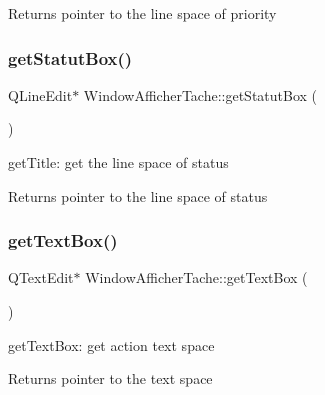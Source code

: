 \begin{DoxyReturn}{Returns}
pointer to the line space of priority 
\end{DoxyReturn}
\mbox{\label{class_window_afficher_tache_ae47fad44c28bba49406b648cb452038d}} 
\subsubsection{\texorpdfstring{get\+Statut\+Box()}{getStatutBox()}}
{\footnotesize\ttfamily Q\+Line\+Edit$\ast$ Window\+Afficher\+Tache\+::get\+Statut\+Box (\begin{DoxyParamCaption}{ }\end{DoxyParamCaption})\hspace{0.3cm}{\ttfamily [inline]}}



get\+Title\+: get the line space of status 

\begin{DoxyReturn}{Returns}
pointer to the line space of status 
\end{DoxyReturn}
\mbox{\label{class_window_afficher_tache_a5fe2e2ee086218f44e4223ce5eeae84c}} 
\subsubsection{\texorpdfstring{get\+Text\+Box()}{getTextBox()}}
{\footnotesize\ttfamily Q\+Text\+Edit$\ast$ Window\+Afficher\+Tache\+::get\+Text\+Box (\begin{DoxyParamCaption}{ }\end{DoxyParamCaption})\hspace{0.3cm}{\ttfamily [inline]}}



get\+Text\+Box\+: get action text space 

\begin{DoxyReturn}{Returns}
pointer to the text space 
\end{DoxyReturn}
\mbox{\label{class_window_afficher_tache_a65f59931ef68115aad28770e998eabd5}} 
